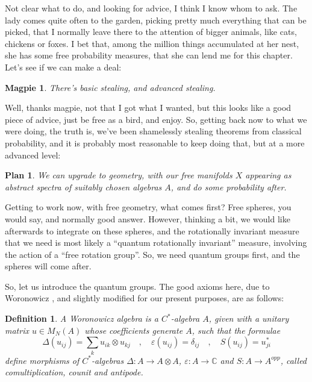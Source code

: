 \documentclass[12pt]{amsbook}
\newtheorem{definition}[theorem]{Definition}
\newtheorem{magpie}[theorem]{Magpie}
\newtheorem{plan}[theorem]{Plan}
\begin{document}
\bigskip

Not clear what to do, and looking for advice, I think I know whom to ask. The lady comes quite often to the garden, picking pretty much everything that can be picked, that I normally leave there to the attention of bigger animals, like cats, chickens or foxes. I bet that, among the million things accumulated at her nest, she has some free probability measures, that she can lend me for this chapter. Let's see if we can make a deal:

\begin{magpie}
There's basic stealing, and advanced stealing.
\end{magpie}

Well, thanks magpie, not that I got what I wanted, but this looks like a good piece of advice, just be free as a bird, and enjoy. So, getting back now to what we were doing, the truth is, we've been shamelessly stealing theorems from classical probability, and it is probably most reasonable to keep doing that, but at a more advanced level:

\begin{plan}
We can upgrade to geometry, with our free manifolds $X$ appearing as abstract spectra of suitably chosen algebras $A$, and do some probability after.
\end{plan} 

Getting to work now, with free geometry, what comes first? Free spheres, you would say, and normally good answer. However, thinking a bit, we would like afterwards to integrate on these spheres, and the rotationally invariant measure that we need is most likely a ``quantum rotationally invariant'' measure, involving the action of a ``free rotation group''. So, we need quantum groups first, and the spheres will come after.

\bigskip

So, let us introduce the quantum groups. The good axioms here, due to Woronowicz \cite{wo1}, and slightly modified for our present purposes, are as follows:

\begin{definition}
A Woronowicz algebra is a $C^*$-algebra $A$, given with a unitary matrix $u\in M_N(A)$ whose coefficients generate $A$, such that the formulae
$$\Delta(u_{ij})=\sum_ku_{ik}\otimes u_{kj}\quad,\quad
\varepsilon(u_{ij})=\delta_{ij}\quad,\quad 
S(u_{ij})=u_{ji}^*$$
define morphisms of $C^*$-algebras $\Delta:A\to A\otimes A$, $\varepsilon:A\to\mathbb C$ and $S:A\to A^{opp}$, called comultiplication, counit and antipode. 
\end{definition}
\end{document}
